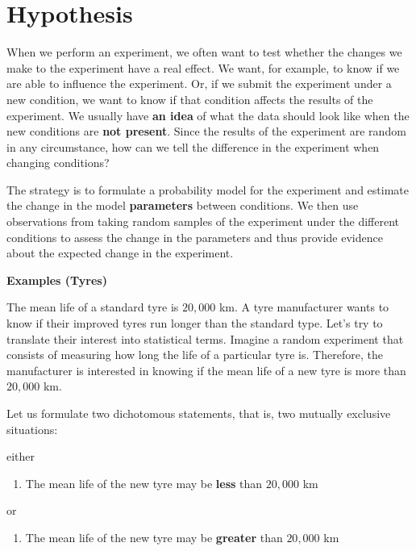 \documentclass[
]{book}
\providecommand{\tightlist}{%
  \setlength{\itemsep}{0pt}\setlength{\parskip}{0pt}}
\begin{document}
\hypertarget{hypothesis}{%
\section{Hypothesis}\label{hypothesis}}

When we perform an experiment, we often want to test whether the changes we make to the experiment have a real effect. We want, for example, to know if we are able to influence the experiment. Or, if we submit the experiment under a new condition, we want to know if that condition affects the results of the experiment. We usually have \textbf{an idea} of what the data should look like when the new conditions are \textbf{not present}. Since the results of the experiment are random in any circumstance, how can we tell the difference in the experiment when changing conditions?

The strategy is to formulate a probability model for the experiment and estimate the change in the model \textbf{parameters} between conditions. We then use observations from taking random samples of the experiment under the different conditions to assess the change in the parameters and thus provide evidence about the expected change in the experiment.

\textbf{Examples (Tyres)}

The mean life of a standard tyre is \(20,000\) km. A tyre manufacturer wants to know if their improved tyres run longer than the standard type. Let's try to translate their interest into statistical terms. Imagine a random experiment that consists of measuring how long the life of a particular tyre is. Therefore, the manufacturer is interested in knowing if the mean life of a new tyre is more than \(20,000\) km.

Let us formulate two dichotomous statements, that is, two mutually exclusive situations:

either

\begin{enumerate}
\def\labelenumi{\alph{enumi}.}
\tightlist
\item
  The mean life of the new tyre may be \textbf{less} than \(20,000\) km
\end{enumerate}

or

\begin{enumerate}
\def\labelenumi{\alph{enumi}.}
\setcounter{enumi}{1}
\tightlist
\item
  The mean life of the new tyre may be \textbf{greater} than \(20,000\) km
\end{enumerate}
\end{document}
